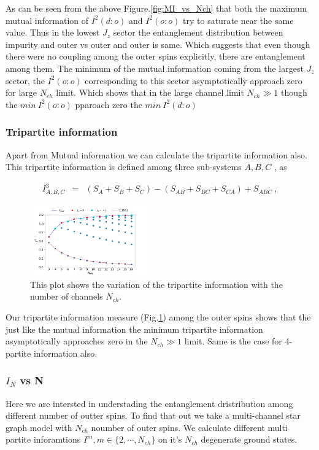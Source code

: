\documentclass[reprint,prb,superscriptaddress]{revtex4-2}
\begin{document}
\par As can be seen from the above Figure.\ref{fig:MI_vs_Nch} that  both the maximum mutual information of $I^2(d:o)$ and $I^2(o:o)$ try to saturate near the same value. Thus in the lowest $J_z$ sector the entanglement distribution between impurity and outer vs outer and outer is same. Which suggests that even though there were no coupling among the outer spins explicitly, there are entanglement among them. The minimum of the mutual information coming from the largest $J_z$ sector, the $I^2(o:o)$ corresponding to this sector asymptotically approach zero for large $N_{ch}$ limit. Which shows that in the large channel limit $N_{ch}\gg 1$ though the $min~I^2(o:o)$ pparoach zero the $min~ I^2(d:o)$ 

\subsubsection{Tripartite information}
\noindent Apart from Mutual information we can calculate the tripartite information also. This tripartite information is defined among three sub-systems $A,B,C$ , as 

\begin{eqnarray}
I^3_{A,B,C} &=& (S_A+S_B+S_C)-(S_{AB}+S_{BC}+S_{CA})+S_{ABC}~,
\end{eqnarray}

\begin{figure}[!ht]
\hspace*{-15pt}
\includegraphics[width=0.45\textwidth]{plt/I_3_vs_Nch_1_2_3}
\caption{This plot shows the variation of the tripartite information with the number of channels $N_{ch}$.}
\label{fig:I3_vs_Nch}
\end{figure}
\noindent Our tripartite information measure (Fig.\ref{fig:I3_vs_Nch}) among the outer spins shows that the just like the mutual information the minimum tripartite information asymptotically approaches zero in the $N_{ch}\gg 1$ limit. Same is the case for 4-partite information also.

\subsubsection{$I_N$ vs N}
\noindent Here we are intersted in understading the entanglement dristribution among different number of outter spins. To find that out we take a multi-channel star graph model with $N_{ch}$ noumber of outer spins. We calculate different multi partite inforamtions $I^m, m\in \{2,\cdots,N_{ch}\}$ on it's $N_{ch}$ degenerate ground states. 
\end{document}
